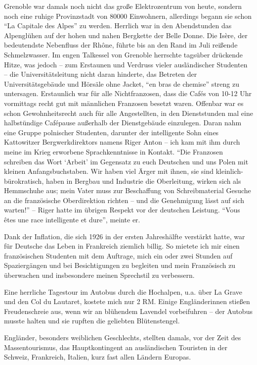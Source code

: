 \documentclass[a5paper,pagesize,10pt,twoside=true]{scrbook}
\begin{document}
Grenoble war damals noch nicht das große Elektrozentrum von heute, sondern noch eine ruhige Provinzstadt von \num{80000} Einwohnern, allerdings begann sie schon \enquote{La Capitale des Alpes} zu werden. Herrlich war in den Abendstunden das Alpenglühen auf der hohen und nahen Bergkette der Belle Donne. Die Isère, der bedeutendste Nebenfluss der Rhône, führte bis an den Rand im Juli reißende Schmelzwasser. Im engen Talkessel von Grenoble herrschte tagsüber drückende Hitze, was jedoch -- zum Erstaunen und Verdruss vieler ausländischer Studenten -- die Universitätsleitung nicht daran hinderte, das Betreten der Universitätsgebäude und Hörsäle ohne Jacket, \enquote{en bras de chemise} streng zu untersagen. Erstaunlich war für alle Nichtfranzosen, dass die Cafés von 10-12 Uhr vormittags recht gut mit männlichen Franzosen besetzt waren. Offenbar war es schon Gewohnheitsrecht auch für alle Angestellten, in den Dienststunden mal eine halbstündige Cafépause außerhalb der Dienstgebäude einzulegen. Daran nahm eine Gruppe polnischer Studenten, darunter der intelligente Sohn eines Kattowitzer Bergwerkdirektors namens Riger Anton -- ich kam mit ihm durch meine im Krieg erworbene Sprachkenntnisse in Kontakt. \enquote{Die Franzosen schreiben das Wort \enquote{Arbeit} im Gegensatz zu euch Deutschen und uns Polen mit kleinen Anfangsbuchstaben. Wir haben viel Ärger mit ihnen, sie sind kleinlich-bürokratisch, haben in Bergbau und Industrie die Oberleitung, wirken sich als Hemmschuhe aus; mein Vater muss zur Beschaffung von Schreibmaterial Gesuche an die französische Oberdirektion richten -- und die Genehmigung lässt auf sich warten!} -- Riger hatte im übrigen Respekt vor der deutschen Leistung. \enquote{Vous êtes une race intelligente et dure}, meinte er.

Dank der Inflation, die sich 1926 in der ersten Jahreshälfte verstärkt hatte, war für Deutsche das Leben in Frankreich ziemlich billig. So mietete ich mir einen französischen Studenten mit dem Auftrage, mich ein oder zwei Stunden auf Spaziergängen und bei Besichtigungen zu begleiten und mein Französisch zu überwachen und insbesondere meinen Sprechstil zu verbessern.

Eine herrliche Tagestour im Autobus durch die Hochalpen, u.a. über La Grave und den Col du Lautaret, kostete mich nur 2 RM. Einige Engländerinnen stießen Freudenschreie aus, wenn wir an blühendem Lavendel vorbeifuhren -- der Autobus musste halten und sie rupften die geliebten Blütenstengel.

Engländer, besonders weiblichen Geschlechts, stellten damals, vor der Zeit des Massentourismus, das Hauptkontingent an ausländischen Touristen in der Schweiz, Frankreich, Italien, kurz fast allen Ländern Europas.
\end{document}
